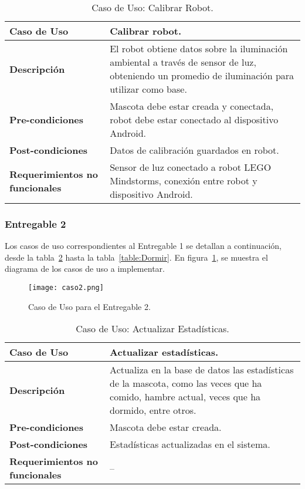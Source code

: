 \begin{table}[htbp!]
  \centering
  \begin{tabular}{|p{4cm}|p{6cm}|}\hline
    \bf{Caso de Uso}                   & Calibrar robot. \\ \hline
    \bf{Descripci\'on}                 & El robot obtiene datos sobre la iluminaci\'on ambiental a trav\'es de sensor de luz, obteniendo un promedio de iluminaci\'on para utilizar como base. \\ \hline
    \bf{Pre-condiciones}               & Mascota debe estar creada y conectada, robot debe estar conectado al dispositivo Android. \\ \hline
    \bf{Post-condiciones}              & Datos de calibraci\'on guardados en robot. \\ \hline
    \bf{Requerimientos no funcionales} & Sensor de luz conectado a robot LEGO Mindstorms, conexi\'on entre robot y dispositivo Android. \\ \hline
  \end{tabular}
  \caption[~Caso de Uso: Calibrar Robot]{Caso de Uso: Calibrar Robot.}
  \label{table:CalibrarRobot}
\end{table}

%
%
\newpage
\subsubsection{Entregable 2}
Los casos de uso correspondientes al Entregable 1 se detallan a continuaci\'on, desde la tabla~\ref{table:ActualizarEstadisticas} hasta la tabla~\ref{table:Dormir}. En figura~\ref{fig:Caso2}, se muestra el diagrama de los casos de uso a implementar.

\begin{figure}[H]
  \centering
  \texttt{[image: caso2.png]}
  \caption[~Caso de Uso Entregable 2]{Caso de Uso para el Entregable 2.}
  \label{fig:Caso2}
\end{figure}

\begin{table}[htbp!]
  \centering
  \begin{tabular}{|p{4cm}|p{6cm}|}\hline
    \bf{Caso de Uso}                   & Actualizar estad\'isticas. \\ \hline
    \bf{Descripci\'on}                 & Actualiza en la base de datos las estad\'isticas de la mascota, como las veces que ha comido, hambre actual, veces que ha dormido, entre otros. \\ \hline
    \bf{Pre-condiciones}               & Mascota debe estar creada. \\ \hline
    \bf{Post-condiciones}              & Estad\'isticas actualizadas en el sistema. \\ \hline
    \bf{Requerimientos no funcionales} & -- \\ \hline
  \end{tabular}
  \caption[~Caso de Uso: Actualizar Estad\'isticas]{Caso de Uso: Actualizar Estad\'isticas.}
  \label{table:ActualizarEstadisticas}
\end{table}


